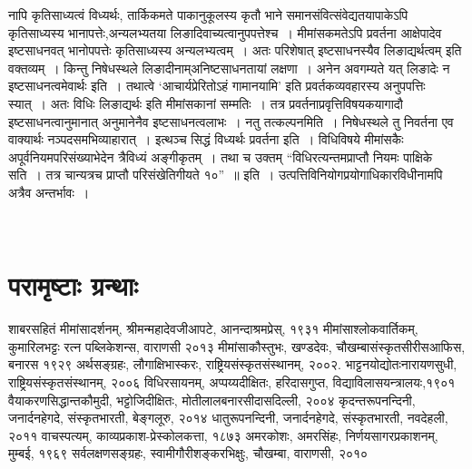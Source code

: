 {नापि कृतिसाध्यत्वं विध्यर्थः, तार्किकमते पाकानुकूलस्य कृतौ भाने समानसंवित्संवेद्य\-तयापाकेऽपि कृतिसाध्यस्य भानापत्तेः,अन्यलभ्यतया लिङादिवाच्यत्वानुपपत्तेश्च~। मीमांस\-कमतेऽपि प्रवर्तना आक्षेपादेव इष्टसाधनवत् भानोपपत्तेः कृतिसाध्यस्य अन्यलभ्यत्वम्~। अतः परिशेषात्  इष्टसाधनस्यैव लिङाद्यर्थत्वम् इति वक्तव्यम्~। किन्तु निषेधस्थले लिङादीनाम्\break अनिष्टसाधनतायां लक्षणा~। अनेन अवगम्यते यत् लिङादेः न इष्टसाधनत्वमेवार्थः इति~। तथात्वे ‘आचार्यप्रेरितोऽहं गामानयामि’ इति प्रवर्तकव्यवहारस्य अनुपपत्तिः स्यात्~। अतः विधिः लिङाद्यर्थः इति मीमांसकानां सम्मतिः~। तत्र प्रवर्तनाप्रवृत्तिविषयकयागादौ इष्टसाधनत्वानुमानात् अनुमानेनैव इष्टसाधनत्वलाभः~। नतु तत्कल्पनमिति~। निषेधस्थले तु निवर्तना एव वाक्यार्थः नञ्पदसमभिव्याहारात्~। इत्थञ्च सिद्धं विध्यर्थः प्रवर्तना इति~।  विधिविषये \-मीमांसकैः अपूर्वनियमपरिसंख्याभेदेन त्रैविध्यं अङ्गीकृतम्~। तथा च उक्तम् “विधिरत्यन्तमप्राप्तौ \-नियमः पाक्षिके सति~। तत्र चान्यत्रच प्राप्तौ परिसंखेतिगीयते १०”~॥ इति~। उत्पत्तिविनियोगप्रयोगाधिकारविधीनामपि अत्रैव अन्तर्भावः~। 

~\\[-1cm]

\section*{परामृष्टाः ग्रन्थाः}
\vskip -1cm

\begin{thebibliography}{99}
 शाबरसहितं मीमांसादर्शनम्, श्रीमन्महादेवजीआपटे, आनन्दाश्रमप्रेस्, १९३१
 मीमांसाश्लोकवार्तिकम्, कुमारिलभट्टः रत्न पब्लिकेशन्स, वाराणसी २०१३
 मीमांसाकौस्तुभः, खण्डदेवः, चौखम्बासंस्कृतसीरीसआफिस, बनारस १९२९
 अर्थसङ्ग्रहः, लौगाक्षिभास्करः, राष्ट्रियसंस्कृतसंस्थानम्, २००२.
 भाट्टनयोद्योतःनारायणसुधी, राष्ट्रियसंस्कृतसंस्थानम्, २००६
 विधिरसायनम्, अप्पय्यदीक्षितः, हरिदासगुप्त, विद्याविलासयन्त्रालयः,१९०१
 वैयाकरणसिद्धान्तकौमुदी, भट्टोजिदीक्षितः, मोतीलालबनारसीदासदिल्ली, २००४
 कृदन्तरूपनन्दिनी, जनार्दनहेगदे, संस्कृतभारती, बेङ्गलूरु, २०१४
 धातुरूपनन्दिनी, जनार्दनहेगदे, संस्कृतभारती, नवदेहली, २०११
 वाचस्पत्यम्, काव्यप्रकाश-प्रेस्कोलकत्ता, १८७३
 अमरकोशः, अमरसिंहः, निर्णयसागरप्रकाशनम्, मुम्बई, १९६९
 सर्वलक्षणसङ्ग्रहः, स्वामीगौरीशङ्करभिक्षुः, चौखम्बा, वाराणसी, २०१०
 {} 
 {} 
\end{thebibliography}

\articleend
}
